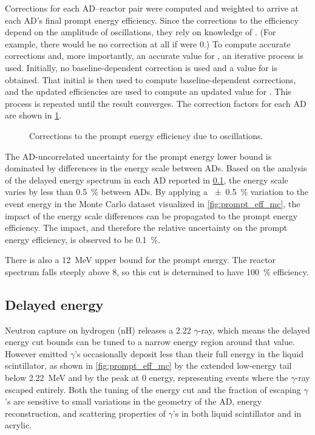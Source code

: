 Corrections for each AD--reactor pair were computed
and weighted to arrive at each AD's final prompt energy efficiency.
Since the corrections to the efficiency depend on
the amplitude of \nuebar{} oscillations, they rely on knowledge of \thetaot.
(For example, there would be no correction at all if \thetaot{} were $0$.)
To compute accurate corrections and, more importantly, an accurate value
for \thetaot{}, an iterative process is used.
Initially, no baseline-dependent correction is used and
a value for \thetaot{} is obtained.
That initial \thetaot{} is then used to compute baseline-dependent corrections,
and the updated efficiencies are used to compute an updated value for \thetaot{}.
This process is repeated until the \thetaot{} result converges.
The correction factors for each AD are shown in \cref{fig:prompt_eff_osc}.

\begin{figure}
    \caption{Corrections to the prompt energy efficiency due to \nuebar{} oscillations.}
    \label{fig:prompt_eff_osc}
\end{figure}

The AD-uncorrelated uncertainty for the prompt energy lower bound
is dominated by differences in the energy scale between ADs.
Based on the analysis of the delayed energy spectrum in each AD
reported in \cref{subsec:delayed}, the energy scale
varies by less than \SI{0.5}{\percent} between ADs.
By applying a \SI{+-0.5}{\percent} variation to
the event energy in the Monte Carlo dataset visualized in \cref{fig:prompt_eff_mc},
the impact of the energy scale differences can be propagated
to the prompt energy efficiency.
The impact, and therefore the relative uncertainty on
the prompt energy efficiency, is observed to be \SI{0.1}{\percent}.


There is also a \SI{12}{\mega\electronvolt} upper bound for the prompt energy.
The reactor \nuebar{} spectrum falls steeply above \SI{8}{\mev},
so this cut is determined to have \SI{100}{\percent} efficiency.

\subsection{Delayed energy}
\label{subsec:delayed}

Neutron capture on hydrogen (nH) releases a
\SI{2.22}{\mev} $\gamma$-ray,
which means the delayed energy cut bounds can be tuned to a narrow energy region
around that value.
However emitted $\gamma$'s occasionally
deposit less than their full energy in the liquid scintillator,
as shown in \cref{fig:prompt_eff_mc} by the extended low-energy tail
below \SI{2.22}{\MeV} and by the peak at \num{0} energy,
representing events where the $\gamma$-ray escaped entirely.
Both the tuning of the energy cut
and the fraction of escaping $\gamma$'s are sensitive to
small variations in the geometry of the AD, energy reconstruction,
and scattering properties of $\gamma$'s in
both liquid scintillator and in acrylic.

